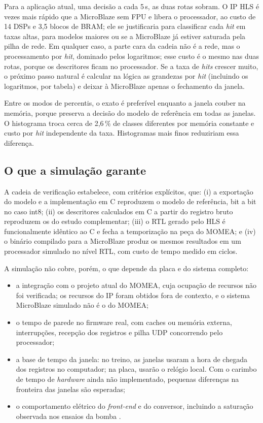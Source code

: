 \documentclass[12pt]{article}
\begin{document}
Para a aplicação atual, uma decisão a cada 5\,s, as duas rotas sobram. \mbParagrafoRota{} O IP HLS é \mbFatorHls{} vezes mais rápido que a MicroBlaze sem FPU e libera o processador, ao custo de 14 DSPs e 3,5 blocos de BRAM; ele se justificaria para classificar cada \textit{hit} em taxas altas, para modelos maiores ou se a MicroBlaze já estiver saturada pela pilha de rede. Em qualquer caso, a parte cara da cadeia não é a rede, mas o processamento por \textit{hit}, dominado pelos logaritmos; esse custo é o mesmo nas duas rotas, porque os descritores ficam no processador. Se a taxa de \textit{hits} crescer muito, o próximo passo natural é calcular na lógica as grandezas por \textit{hit} (incluindo os logaritmos, por tabela) e deixar à MicroBlaze apenas o fechamento da janela.

Entre os modos de percentis, o exato é preferível enquanto a janela couber na memória, porque preserva a decisão do modelo de referência em todas as janelas. O histograma troca cerca de 2,6\,\% de classes diferentes por memória constante e custo por \textit{hit} independente da taxa. Histogramas mais finos reduziriam essa diferença.

\subsection{O que a simulação garante}

A cadeia de verificação estabelece, com critérios explícitos, que: (i) a exportação do modelo e a implementação em C reproduzem o modelo de referência, bit a bit no caso int8; (ii) os descritores calculados em C a partir do registro bruto reproduzem os do estudo complementar; (iii) o RTL gerado pelo HLS é funcionalmente idêntico ao C e fecha a temporização na peça do MOMEA; e (iv) o binário compilado para a MicroBlaze produz os mesmos resultados em um processador simulado no nível RTL, com custo de tempo medido em ciclos.

A simulação não cobre, porém, o que depende da placa e do sistema completo:
\begin{itemize}
	\item a integração com o projeto atual do MOMEA, cuja ocupação de recursos não foi verificada; os recursos do IP foram obtidos fora de contexto, e o sistema MicroBlaze simulado não é o do MOMEA;
	\item o tempo de parede no firmware real, com caches ou memória externa, interrupções, recepção dos registros e pilha UDP concorrendo pelo processador;
	\item a base de tempo da janela: no treino, as janelas usaram a hora de chegada dos registros no computador; na placa, usarão o relógio local. Com o carimbo de tempo de \textit{hardware} ainda não implementado, pequenas diferenças na fronteira das janelas são esperadas;
	\item o comportamento elétrico do \textit{front-end} e do conversor, incluindo a saturação observada nos ensaios da bomba \cite{mlpbomba2026}.
\end{itemize}
\end{document}
